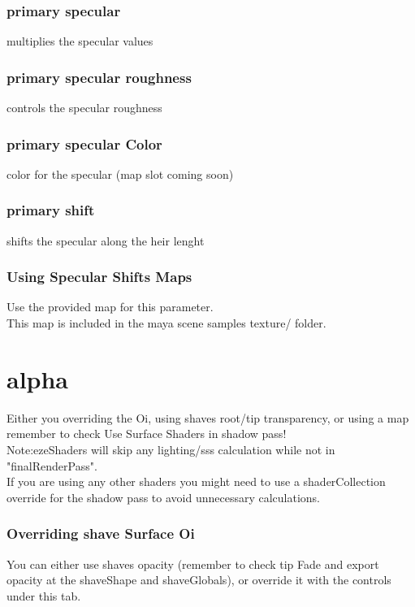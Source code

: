 \documentclass[final,letterpaper,twoside,12pt]{report}
\begin{document}
\subsubsection {primary specular}
multiplies the specular values
\smallskip
\subsubsection {primary specular roughness}
controls the specular roughness
\smallskip
\subsubsection {primary specular Color}
color for the specular (map slot coming soon)
\smallskip
\subsubsection {primary shift}
shifts the specular along the heir lenght
\smallskip
\subsubsection {Using Specular Shifts Maps}
Use the provided map for this parameter.\\
This map is included in the maya scene samples texture/ folder.
\smallskip
\section {alpha}
Either you overriding the Oi, using shaves root/tip transparency, or using a map remember to check Use Surface Shaders in shadow pass!\\
Note:ezeShaders will skip any lighting/sss calculation while not in "finalRenderPass".\\
If you are using any other shaders you might need to use a shaderCollection override for the shadow pass to avoid unnecessary calculations.
\subsubsection {Overriding shave Surface Oi}
You can either use shaves opacity (remember to check tip Fade and export opacity at the shaveShape and shaveGlobals), or override it with the controls under this tab.
\end{document}
